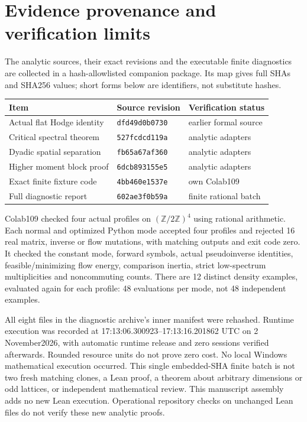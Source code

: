 \documentclass[11pt]{article}
\begin{document}
\section{Evidence provenance and verification limits}\label{ap:sec:evidence}
The analytic sources, their exact revisions and the executable finite diagnostics are
collected in a hash-allowlisted companion package. Its map gives full SHAs and SHA256
values; short forms below are identifiers, not substitute hashes.
\begin{center}\small
\begin{tabular}{lll}
Item & Source revision & Verification status\\\hline
Actual flat Hodge identity & \texttt{dfd49d0b0730} & earlier formal source\\
Critical spectral theorem & \texttt{527fcdcd119a} & analytic adapters\\
Dyadic spatial separation & \texttt{fb65a67af360} & analytic adapters\\
Higher moment block proof & \texttt{6dcb893155e5} & analytic adapters\\
Exact finite fixture code & \texttt{4bb460e1537e} & own Colab109\\
Full diagnostic report & \texttt{602ae3f0b59a} & finite rational batch
\end{tabular}
\end{center}
Colab109 checked four actual profiles on $(\mathbb Z/2\mathbb Z)^4$ using rational
arithmetic. Each normal and optimized Python mode accepted four profiles and rejected
16 real matrix, inverse or flow mutations, with matching outputs and exit code zero.
It checked the constant mode, forward symbols, actual pseudoinverse identities,
feasible/minimizing flow energy, comparison inertia, strict low-spectrum multiplicities
and noncommuting counts. There are 12 distinct density examples, evaluated again for
each profile: 48 evaluations per mode, not 48 independent examples.

All eight files in the diagnostic archive's inner manifest were rehashed. Runtime
execution was recorded at 17:13:06.300923--17:13:16.201862 UTC on 2 November2026,
with automatic runtime release and zero sessions verified afterwards. Rounded resource
units do not prove zero cost. No local Windows mathematical execution occurred.
This single embedded-SHA finite batch is not two fresh matching clones, a Lean proof,
a theorem about arbitrary dimensions or odd lattices, or independent mathematical review.
This manuscript assembly adds no new Lean execution. Operational repository checks
on unchanged Lean files do not verify these new analytic proofs.
\end{document}
